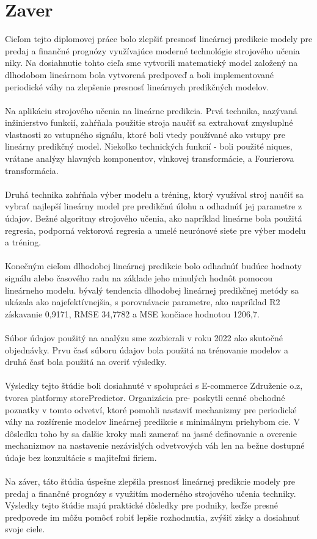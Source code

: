     \section{Zaver}
    Cieľom tejto diplomovej práce bolo zlepšiť presnosť lineárnej predikcie
    modely pre predaj a finančné prognózy využívajúce moderné technológie strojového učenia
    niky. Na dosiahnutie tohto cieľa sme vytvorili matematický model založený na dlhodobom lineárnom
    bola vytvorená predpoveď a boli implementované periodické váhy na zlepšenie
    presnosť lineárnych predikčných modelov.\\
    \\
    Na aplikáciu strojového učenia na lineárne predikcia. Prvá technika, nazývaná inžinierstvo funkcií,
    zahŕňala použitie stroja naučiť sa extrahovať zmysluplné vlastnosti zo vstupného signálu, ktoré boli vtedy
    používané ako vstupy pre lineárny predikčný model. Niekoľko technických funkcií -
    boli použité niques, vrátane analýzy hlavných komponentov, vlnkovej transformácie,
    a Fourierova transformácia.\\
    \\
    Druhá technika zahŕňala výber modelu a tréning, ktorý využíval stroj
    naučiť sa vybrať najlepší lineárny model pre predikčnú úlohu a odhadnúť jej
    parametre z údajov. Bežné algoritmy strojového učenia, ako napríklad lineárne
    bola použitá regresia, podporná vektorová regresia a umelé neurónové siete
    pre výber modelu a tréning.\\
    \\
    Konečným cieľom dlhodobej lineárnej predikcie bolo odhadnúť budúce hodnoty
    signálu alebo časového radu na základe jeho minulých hodnôt pomocou lineárneho modelu. bývalý
    tendencia dlhodobej lineárnej predikčnej metódy sa ukázala ako najefektívnejšia, s
    porovnávacie parametre, ako napríklad R2 získavanie 0,9171, RMSE 34,7782 a MSE
    končiace hodnotou 1206,7.\\
    \\
    Súbor údajov použitý na analýzu sme zozbierali v roku 2022 ako skutočné objednávky. Prvu
    časť súboru údajov bola použitá na trénovanie modelov a druhá časť bola použitá na
    overiť výsledky.\\
    \\
    Výsledky tejto štúdie boli dosiahnuté v spolupráci s E-commerce
    Združenie o.z, tvorca platformy storePredictor. Organizácia pre-
    poskytli cenné obchodné poznatky v tomto odvetví, ktoré pomohli nastaviť mechanizmy
    pre periodické váhy na rozšírenie modelov lineárnej predikcie s minimálnym priehybom
    cie. V dôsledku toho by sa ďalšie kroky mali zamerať na jasné definovanie a overenie
    mechanizmov na nastavenie nezávislých odvetvových váh len na bežne dostupné údaje
    bez konzultácie s majiteľmi firiem.\\
    \\
    Na záver, táto štúdia úspešne zlepšila presnosť lineárnej predikcie
    modely pre predaj a finančné prognózy s využitím moderného strojového učenia
    techniky. Výsledky tejto štúdie majú praktické dôsledky pre podniky,
    keďže presné predpovede im môžu pomôcť robiť lepšie rozhodnutia, zvýšiť zisky a
    dosiahnuť svoje ciele.

